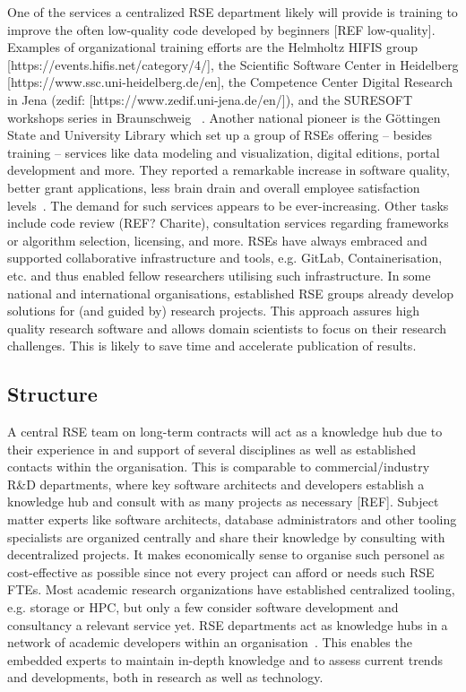 \documentclass[a4paper]{article}
\begin{document}
One of the services a centralized RSE department likely will provide is training to improve the often low-quality code developed by beginners [REF low-quality].
Examples of organizational training efforts are the Helmholtz HIFIS group [https://events.hifis.net/category/4/], the Scientific Software Center in Heidelberg [https://www.ssc.uni-heidelberg.de/en], the Competence Center Digital Research in Jena (zedif: [https://www.zedif.uni-jena.de/en/]), and the SURESOFT workshops series in Braunschweig ~\autocite{SURESOFTLink, Blech2022}.
Another national pioneer is the Göttingen State and University Library which set up a group of RSEs offering – besides training – services like data modeling and visualization, digital editions, portal development and more. They reported a remarkable increase in software quality, better grant applications, less brain drain and overall employee satisfaction levels~\autocite{schimavoigt2023}.
The demand for such services appears to be ever-increasing.
Other tasks include code review (REF? Charite), consultation services regarding frameworks or algorithm selection, licensing, and more. 
RSEs have always embraced and supported collaborative infrastructure and tools, e.g. GitLab, Containerisation, etc. and thus enabled fellow researchers utilising such infrastructure. 
In some national and international organisations, established RSE groups already develop solutions for (and guided by) research projects. This approach assures high quality research software and allows domain scientists to focus on their research challenges. 
This is likely to save time and accelerate publication of results.



\subsection{Structure}

A central RSE team on long-term contracts will act as a knowledge hub due to their experience in and support of several disciplines as well as established contacts within the organisation.
This is comparable to commercial/industry R\&D departments, where key software architects and developers establish a knowledge hub and consult with as many projects as necessary [REF].
Subject matter experts like software architects, database administrators and other tooling specialists are organized centrally and share their knowledge by consulting with decentralized projects. It makes economically sense to organise such personel as cost-effective as possible since not every project can afford or needs such RSE FTEs. 
Most academic research organizations have established centralized tooling, e.g. storage or HPC, but only a few consider software development and consultancy a relevant service yet. 
RSE departments act as knowledge hubs in a network of academic developers within an organisation~\autocite{Elsholz2006}.
This enables the embedded experts to maintain in-depth knowledge and to assess current trends and developments, both in research as well as technology.
\end{document}
